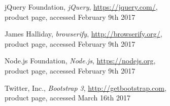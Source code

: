 \documentclass[conference]{IEEEtran}
\begin{document}
\begin{thebibliography}{1}
jQuery Foundation, \emph{jQuery}, \url{https://jquery.com/},\\ product page,
accessed February 9th 2017

James Halliday, \emph{browserify}, \url{http://browserify.org/},\\ product page,
accessed February 9th 2017

Node.js Foundation, \emph{Node.js}, \url{https://nodejs.org},\\ product page,
accessed February 9th 2017

Twitter, Inc., \emph{Bootstrap 3}, \url{http://getbootstrap.com},\\ product page,
accessed March 16th 2017

\end{thebibliography}
\end{document}
